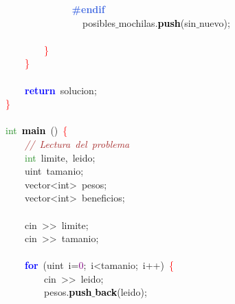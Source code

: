 \mbox{}\textbf{\textcolor{RoyalBlue}{\ \ \ \ \ \ \ \ \ \ \ \ \#endif}} \\
\mbox{}\ \ \ \ \ \ \ \ \ \ \ \ \ \ \ \ posibles$\_$mochilas\textcolor{BrickRed}{.}\textbf{\textcolor{Black}{push}}\textcolor{BrickRed}{(}sin$\_$nuevo\textcolor{BrickRed}{);} \\
\mbox{}\ \ \ \ \ \ \ \ \ \ \ \  \\
\mbox{}\ \ \ \ \ \ \ \ \textcolor{Red}{\}} \\
\mbox{}\ \ \ \ \textcolor{Red}{\}} \\
\mbox{} \\
\mbox{}\ \ \ \ \textbf{\textcolor{Blue}{return}}\ solucion\textcolor{BrickRed}{;} \\
\mbox{}\textcolor{Red}{\}}\  \\
\mbox{} \\
\mbox{}\textcolor{ForestGreen}{int}\ \textbf{\textcolor{Black}{main}}\ \textcolor{BrickRed}{()}\ \textcolor{Red}{\{} \\
\mbox{}\ \ \ \ \textit{\textcolor{Brown}{//\ Lectura\ del\ problema}} \\
\mbox{}\ \ \ \ \textcolor{ForestGreen}{int}\ limite\textcolor{BrickRed}{,}\ leido\textcolor{BrickRed}{;} \\
\mbox{}\ \ \ \ \textcolor{TealBlue}{uint}\ tamanio\textcolor{BrickRed}{;} \\
\mbox{}\ \ \ \ \textcolor{TealBlue}{vector\textless{}int\textgreater{}}\ pesos\textcolor{BrickRed}{;} \\
\mbox{}\ \ \ \ \textcolor{TealBlue}{vector\textless{}int\textgreater{}}\ beneficios\textcolor{BrickRed}{;} \\
\mbox{} \\
\mbox{}\ \ \ \ cin\ \textcolor{BrickRed}{\textgreater{}\textgreater{}}\ limite\textcolor{BrickRed}{;} \\
\mbox{}\ \ \ \ cin\ \textcolor{BrickRed}{\textgreater{}\textgreater{}}\ tamanio\textcolor{BrickRed}{;} \\
\mbox{}\ \ \ \  \\
\mbox{}\ \ \ \ \textbf{\textcolor{Blue}{for}}\ \textcolor{BrickRed}{(}\textcolor{TealBlue}{uint}\ i\textcolor{BrickRed}{=}\textcolor{Purple}{0}\textcolor{BrickRed}{;}\ i\textcolor{BrickRed}{\textless{}}tamanio\textcolor{BrickRed}{;}\ i\textcolor{BrickRed}{++)}\ \textcolor{Red}{\{} \\
\mbox{}\ \ \ \ \ \ \ \ cin\ \textcolor{BrickRed}{\textgreater{}\textgreater{}}\ leido\textcolor{BrickRed}{;} \\
\mbox{}\ \ \ \ \ \ \ \ pesos\textcolor{BrickRed}{.}\textbf{\textcolor{Black}{push$\_$back}}\textcolor{BrickRed}{(}leido\textcolor{BrickRed}{);} \\

